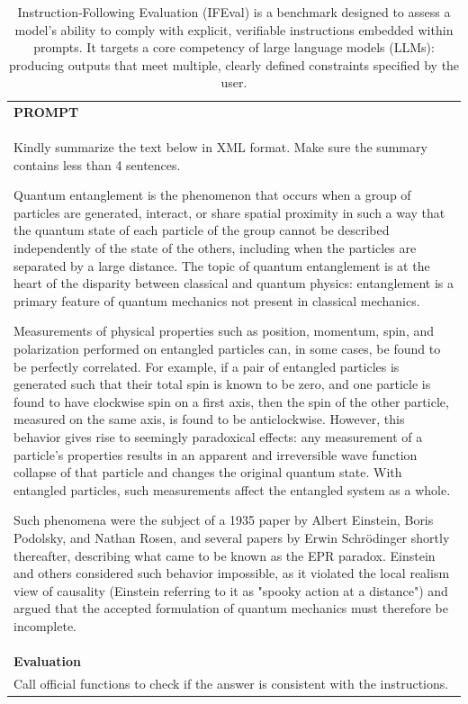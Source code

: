 \begin{table}[h]
    \centering \small
        \caption{Instruction‑Following Evaluation (IFEval) is a benchmark designed to assess a model’s ability to comply with explicit, verifiable instructions embedded within prompts. It targets a core competency of large language models (LLMs): producing outputs that meet multiple, clearly defined constraints specified by the user.}
    \label{tab:ifeval_eval_format_example}
    \begin{tabular}{p{}}
    \hline
    \textbf{PROMPT}\\
    Kindly summarize the text below in XML format. Make sure the summary contains less than 4 sentences.

Quantum entanglement is the phenomenon that occurs when a group of particles are generated, interact, or share spatial proximity in such a way that the quantum state of each particle of the group cannot be described independently of the state of the others, including when the particles are separated by a large distance. The topic of quantum entanglement is at the heart of the disparity between classical and quantum physics: entanglement is a primary feature of quantum mechanics not present in classical mechanics.

Measurements of physical properties such as position, momentum, spin, and polarization performed on entangled particles can, in some cases, be found to be perfectly correlated. For example, if a pair of entangled particles is generated such that their total spin is known to be zero, and one particle is found to have clockwise spin on a first axis, then the spin of the other particle, measured on the same axis, is found to be anticlockwise. However, this behavior gives rise to seemingly paradoxical effects: any measurement of a particle's properties results in an apparent and irreversible wave function collapse of that particle and changes the original quantum state. With entangled particles, such measurements affect the entangled system as a whole.

Such phenomena were the subject of a 1935 paper by Albert Einstein, Boris Podolsky, and Nathan Rosen, and several papers by Erwin Schrödinger shortly thereafter, describing what came to be known as the EPR paradox. Einstein and others considered such behavior impossible, as it violated the local realism view of causality (Einstein referring to it as "spooky action at a distance") and argued that the accepted formulation of quantum mechanics must therefore be incomplete.\\ \hline
      \textbf{Evaluation}\\
      Call official functions to check if the answer is consistent with the instructions. \\ \hline
    \end{tabular}
\end{table}

